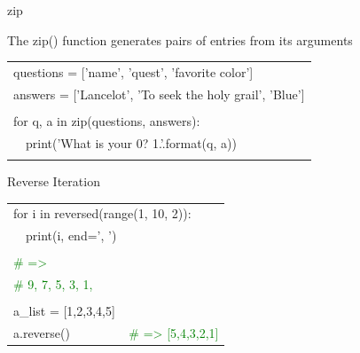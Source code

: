 \documentclass[serif, aspectratio=169]{beamer}
\newcommand{\tgreen}[1]{\textcolor{green}{#1}}
\newenvironment{CLI} %
    {
    \noindent
    \ttfamily 
    \footnotesize
    \begin{tcolorbox}[colback=gray!150,colframe=black]
    \color{white}
    \begin{tabular}{p{4.5cm}p{7.5cm}}
    }
    { 
    \end{tabular}
    \end{tcolorbox}
    }
\begin{document}
\begin{frame}{zip}
    \begin{block}{The zip() function generates pairs of entries from its arguments}
        \vspace{2pt}
        \begin{CLI}
            \multicolumn{2}{l}{questions = ['name', 'quest', 'favorite color']} \\
            \multicolumn{2}{l}{answers = ['Lancelot', 'To seek the holy grail', 'Blue']} \\
            & \\
            \multicolumn{2}{l}{for q, a in zip(questions, answers):} \\
            \multicolumn{2}{l}{~~print('What is your {0}? {1}.'.format(q, a))} \\
            & \\
        \end{CLI}
    \end{block}
\end{frame}

\begin{frame}{Reverse Iteration}
    \begin{CLI}
        \multicolumn{2}{l}{for i in reversed(range(1, 10, 2)):} \\
        ~~print(i, end=', ') & \\
        & \\
        \tgreen{\# =>} & \\
        \tgreen{\# 9, 7, 5, 3, 1,} & \\
        & \\
        a\_list = [1,2,3,4,5] & \\
        a.reverse() & \tgreen{\# => [5,4,3,2,1]} \\
    \end{CLI} 
\end{frame}
\end{document}

